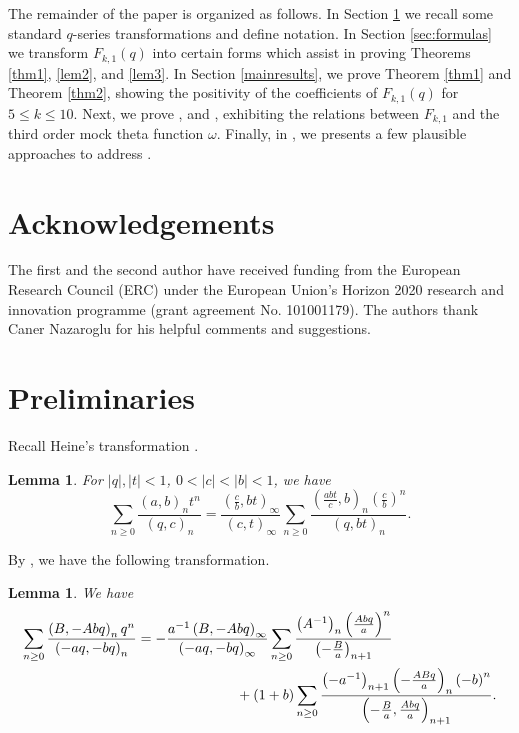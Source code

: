 \documentclass[12pt,reqno]{amsart}
\renewcommand{\(}{\left\(}
\renewcommand{\)}{\right\)}
\newcommand{\pa}[2]{\left(\frac{#1}{#2}\right)}
\numberwithin{equation}{section}
\theoremstyle{plain}
\newtheorem{lemma}[theorem]{Lemma}
\theoremstyle{definition}
\numberwithin{equation}{section}
\newcommand{\kbf}{\bf\color{green!40!black!60!}}
\begin{document}
The remainder of the paper is organized as follows. In Section \ref{sec:prelim} we recall some standard $q$-series transformations and define notation. In Section \ref{sec:formulas} we transform $F_{k,1}(q)$ into certain forms which assist in proving Theorems \ref{thm1}, \ref{lem2}, and \ref{lem3}. In Section \ref{mainresults}, we prove Theorem \ref{thm1} and Theorem \ref{thm2}, showing the positivity of the coefficients of $F_{k,1}(q)$ for $5\le k \leq 10$. Next, we prove , and , exhibiting the relations between $F_{k,1}$ and the third order mock theta function $\omega$. Finally, in , we presents a few plausible approaches to address .

\section*{Acknowledgements}
The first and the second author have received funding from the European Research Council (ERC)
under the European Union's Horizon 2020 research and innovation programme (grant agreement
No. 101001179). The authors thank Caner Nazaroglu for his helpful comments and suggestions.

\section{Preliminaries}\label{sec:prelim}
Recall Heine's transformation \cite[Corollary 1.2.4]{AndB}. %
\begin{lemma}\label{HeineTransform}
	For $|q|, |t|<1$, $0<|c|<|b|<1$, we have
	\[
	\sum_{n\ge 0}\frac{(a,b)_nt^n}{(q,c)_n}=\frac{\left(\frac cb,bt\right)_{\infty}}{(c,t)_{\infty}}\sum_{n\ge 0}\frac{\left(\frac{abt}{c},b\right)_n\pa{c}{b}^n}{(q,bt)_n}.
	\]
\end{lemma}
By \cite[Theorem 1]{A0}, we have the following transformation.
\begin{lemma}\label{ThmA0}
	We have
	\begin{align*}
	\sum_{n\ge 0}\frac{\left(B,-Abq\right)_nq^n}{\left(-aq,-bq\right)_n}&=-\frac{a^{-1}\left(B,-Abq\right)_{\infty}}{\left(-aq,-bq\right)_{\infty}}\sum_{n\ge 0}\frac{\left(A^{-1}\right)_n\pa{Abq}{a}^n}{\left(-\frac{B}{a}\right)_{n+1}}\\
	&\hspace{2.5 cm}+\left(1+b\right)\sum_{n\ge 0}\frac{\left(-a^{-1}\right)_{n+1}\left(-\frac{ABq}{a}\right)_n\left(-b\right)^n}{\left(-\frac{B}{a},\frac{Abq}{a}\right)_{n+1}}.
	\end{align*}
\end{lemma}
\end{document}
